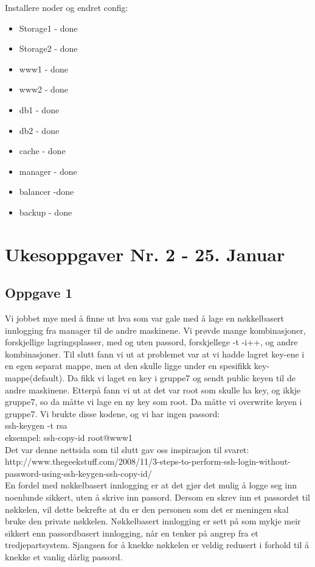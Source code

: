 \documentclass[a4paper, norsk, 12pt]{article}
\begin{document}
Installere noder og endret config:
\begin{itemize}
\item Storage1 - done
\item Storage2 - done
\item www1 - done
\item www2 - done
\item db1 - done
\item db2 - done
\item cache - done
\item manager - done
\item balancer -done
\item backup - done
\end{itemize}

\section{Ukesoppgaver Nr. 2 - 25. Januar}
\subsection{Oppgave 1}
Vi jobbet mye med å finne ut hva som var gale med å lage en nøkkelbasert innlogging fra manager til de andre maskinene. Vi prøvde mange kombinasjoner, forskjellige lagringsplasser, med og uten passord, forskjellege -t -i++, og andre kombinasjoner. Til slutt fann vi ut at problemet var at vi hadde lagret key-ene i en egen separat mappe, men at den skulle ligge under en spesifikk key-mappe(default). Da fikk vi laget en key i gruppe7 og sendt public keyen til de andre maskinene. Etterpå fann vi ut at det var root som skulle ha key, og ikkje gruppe7, so da måtte vi lage en ny key som root. Da måtte  vi overwrite keyen i gruppe7. Vi brukte disse kodene, og vi har ingen passord:\\

  ssh-keygen -t rsa\\
  eksempel: ssh-copy-id root@www1\\
  
Det var denne nettsida som til slutt gav oss inspirasjon til svaret:\\
http://www.thegeekstuff.com/2008/11/3-steps-to-perform-ssh-login-without-password-using-ssh-keygen-ssh-copy-id/\\

En fordel med nøkkelbasert innlogging er at det gjør det mulig å logge seg inn noenlunde sikkert, uten å skrive inn passord. Dersom en skrev inn et passordet til nøkkelen, vil dette bekrefte at du er den personen som det er meningen skal bruke den private nøkkelen. Nøkkelbasert innlogging er sett på som mykje meir sikkert enn passordbasert innlogging, når en tenker på angrep fra et tredjepartsystem. Sjangsen for å knekke nøkkelen er veldig redusert i forhold til å knekke et vanlig dårlig passord.\\
\end{document}
